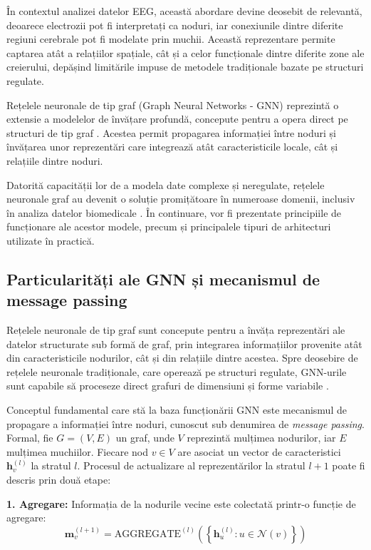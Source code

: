 \documentclass[12pt,a4paper]{report}
\theoremstyle{definition}
\theoremstyle{remark}
\begin{document}
În contextul analizei datelor EEG, această abordare devine deosebit de relevantă, deoarece electrozii pot fi interpretați ca noduri, iar conexiunile dintre diferite regiuni cerebrale pot fi modelate prin muchii. Această reprezentare permite captarea atât a relațiilor spațiale, cât și a celor funcționale dintre diferite zone ale creierului, depășind limitările impuse de metodele tradiționale bazate pe structuri regulate.

Rețelele neuronale de tip graf (Graph Neural Networks - GNN) reprezintă o extensie a modelelor de învățare profundă, concepute pentru a opera direct pe structuri de tip graf \cite{klepl2023gnn}. Acestea permit propagarea informației între noduri și învățarea unor reprezentări care integrează atât caracteristicile locale, cât și relațiile dintre noduri.

Datorită capacității lor de a modela date complexe și neregulate, rețelele neuronale graf au devenit o soluție promițătoare în numeroase domenii, inclusiv în analiza datelor biomedicale \cite{rahman2025advancement}. În continuare, vor fi prezentate principiile de funcționare ale acestor modele, precum și principalele tipuri de arhitecturi utilizate în practică.

\subsection{Particularități ale GNN și mecanismul de message passing}

Rețelele neuronale de tip graf sunt concepute pentru a învăța reprezentări ale datelor structurate sub formă de graf, prin integrarea informațiilor provenite atât din caracteristicile nodurilor, cât și din relațiile dintre acestea. Spre deosebire de rețelele neuronale tradiționale, care operează pe structuri regulate, GNN-urile sunt capabile să proceseze direct grafuri de dimensiuni și forme variabile \cite{rahman2025advancement}.

Conceptul fundamental care stă la baza funcționării GNN este mecanismul de propagare a informației între noduri, cunoscut sub denumirea de \textit{message passing}. Formal, fie $G = (V, E)$ un graf, unde $V$ reprezintă mulțimea nodurilor, iar $E$ mulțimea muchiilor. Fiecare nod $v \in V$ are asociat un vector de caracteristici $\mathbf{h}_v^{(l)}$ la stratul $l$. Procesul de actualizare al reprezentărilor la stratul $l+1$ poate fi descris prin două etape:

\textbf{1. Agregare:} Informația de la nodurile vecine este colectată printr-o funcție de agregare:
\begin{equation}
    \mathbf{m}_v^{(l+1)} = \text{AGGREGATE}^{(l)}\left(\left\{ \mathbf{h}_u^{(l)} : u \in \mathcal{N}(v) \right\}\right)
    \label{eq:aggregate}
\end{equation}
\end{document}
